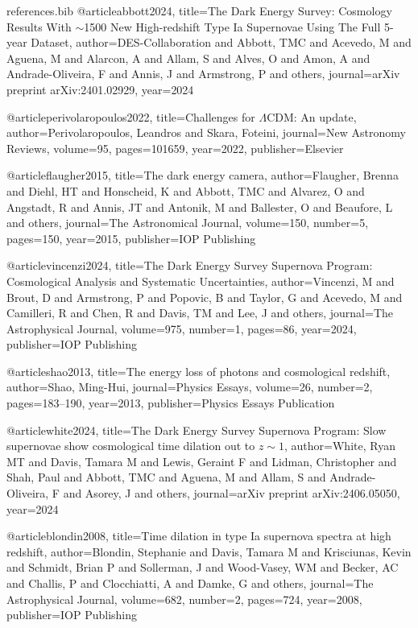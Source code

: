 \documentclass[aps,prl,reprint,amsmath,floatfix]{revtex4-2}
\begin{document}
\begin{filecontents}{references.bib}
@article{abbott2024,
  title={The Dark Energy Survey: Cosmology Results With $\sim$1500 New High-redshift Type Ia Supernovae Using The Full 5-year Dataset},
  author={DES-Collaboration and Abbott, TMC and Acevedo, M and Aguena, M and Alarcon, A and Allam, S and Alves, O and Amon, A and Andrade-Oliveira, F and Annis, J and Armstrong, P and others},
  journal={arXiv preprint arXiv:2401.02929},
  year={2024}
}

@article{perivolaropoulos2022,
  title={Challenges for $\Lambda$CDM: An update},
  author={Perivolaropoulos, Leandros and Skara, Foteini},
  journal={New Astronomy Reviews},
  volume={95},
  pages={101659},
  year={2022},
  publisher={Elsevier}
}

@article{flaugher2015,
  title={The dark energy camera},
  author={Flaugher, Brenna and Diehl, HT and Honscheid, K and Abbott, TMC and Alvarez, O and Angstadt, R and Annis, JT and Antonik, M and Ballester, O and Beaufore, L and others},
  journal={The Astronomical Journal},
  volume={150},
  number={5},
  pages={150},
  year={2015},
  publisher={IOP Publishing}
}

@article{vincenzi2024,
  title={The Dark Energy Survey Supernova Program: Cosmological Analysis and Systematic Uncertainties},
  author={Vincenzi, M and Brout, D and Armstrong, P and Popovic, B and Taylor, G and Acevedo, M and Camilleri, R and Chen, R and Davis, TM and Lee, J and others},
  journal={The Astrophysical Journal},
  volume={975},
  number={1},
  pages={86},
  year={2024},
  publisher={IOP Publishing}
}

@article{shao2013,
  title={The energy loss of photons and cosmological redshift},
  author={Shao, Ming-Hui},
  journal={Physics Essays},
  volume={26},
  number={2},
  pages={183--190},
  year={2013},
  publisher={Physics Essays Publication}
}

@article{white2024,
  title={The Dark Energy Survey Supernova Program: Slow supernovae show cosmological time dilation out to $ z \sim 1$},
  author={White, Ryan MT and Davis, Tamara M and Lewis, Geraint F and Lidman, Christopher and Shah, Paul and Abbott, TMC and Aguena, M and Allam, S and Andrade-Oliveira, F and Asorey, J and others},
  journal={arXiv preprint arXiv:2406.05050},
  year={2024}
}

@article{blondin2008,
  title={Time dilation in type Ia supernova spectra at high redshift},
  author={Blondin, Stephanie and Davis, Tamara M and Krisciunas, Kevin and Schmidt, Brian P and Sollerman, J and Wood-Vasey, WM and Becker, AC and Challis, P and Clocchiatti, A and Damke, G and others},
  journal={The Astrophysical Journal},
  volume={682},
  number={2},
  pages={724},
  year={2008},
  publisher={IOP Publishing}
}


\end{filecontents}
\end{document}

